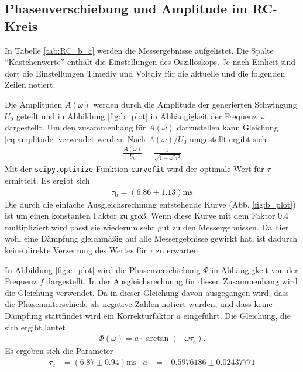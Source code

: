 \subsection{Phasenverschiebung und Amplitude im RC-Kreis}
In Tabelle \ref{tab:RC_b_c} werden die Messergebnisse aufgelistet. 
Die Spalte \enquote{Kästchenwerte} enthält die Einstellungen des Oszilloskops.
Je nach Einheit sind dort die Einstellungen Timediv und Voltdiv für die aktuelle und die folgenden Zeilen notiert.
%

%
Die Amplituden $A(\omega)$ werden durch die Amplitude der generierten Schwingung $U_0$ geteilt und in Abbildung \ref{fig:b_plot}
in Abhängigkeit der Frequenz $\omega$ dargestellt.
Um den zusammenhang für $A(\omega)$ darzustellen kann Gleichung \ref{eq:amplitude} verwendet werden.
Nach $A(\omega) / U_0$ umgestellt ergibt sich
\begin{align*}
    \frac{A(\omega)}{U_0} = \frac{1}{\sqrt{1 + \omega^2  \tau^2}}
\end{align*}
Mit der \texttt{scipy.optimize} Funktion \texttt{curvefit} \cite{scipy} wird der optimale Wert für $\tau$ ermittelt.
Es ergibt sich 
\begin{align}
    \tau_\text{b} = (\num{6.86}\pm \num{1.13})\unit{\milli\s} 
    \label{eq:tau_b}
\end{align}
Die durch die einfache Ausgleichsrechnung entstehende Kurve (Abb. \ref{fig:b_plot}) ist um einen konstanten Faktor zu groß.
Wenn diese Kurve mit dem Faktor \num{0.4} multipliziert wird passt sie wiederum sehr gut zu den Messergebnissen.
Da hier wohl eine Dämpfung gleichmäßig auf alle Messergebnisse gewirkt hat,
ist dadurch keine direkte Verzerrung des Wertes für $\tau$ zu erwarten.
%


In Abbildung \ref{fig:c_plot} wird die Phasenverschiebung $\Phi$ in Abhängigkeit von der Frequenz $f$ dargestellt.
In der Ausgleichsrechnung für diesen Zusammenhang wird die Gleichung  verwendet.
Da in dieser Gleichung davon ausgegangen wird, dass die Phasenunterschiede als negative Zahlen notiert wurden,
und dass keine Dämpfung stattfindet wird ein Korrekturfaktor $a$ eingeführt.
Die Gleichung, die sich ergibt lautet
\begin{align*}
    \Phi(\omega) = a \cdot \arctan(- \omega \tau_\text{c}).
\end{align*}
Es ergeben sich die Parameter
\begin{align}
    \tau_\text{c} &= (\num{6.87} \pm \num{0.94}) \unit{\milli\s} & a &= \num{-0.5976186} \pm \num{0.02437771}
    \label{eq:tau_c}
\end{align}
% 



